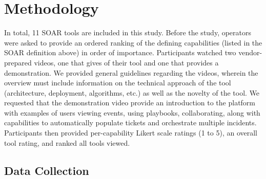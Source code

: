 \section{Methodology}
\vspace{-4mm}
In total, 11 SOAR tools are included in this study.
Before the study, operators were asked to provide an ordered ranking of the defining capabilities (listed in the SOAR definition above) in order of importance. 
Participants watched two vendor-prepared videos, one that gives of their tool and one that provides a demonstration. We provided general guidelines regarding the videos, wherein the overview must include information on the technical approach of the tool (architecture, deployment, algorithms, etc.) as well as the novelty of the tool. We requested that the demonstration video provide an introduction to the platform with examples of users viewing events, using playbooks, collaborating, along with capabilities to automatically populate tickets and orchestrate multiple incidents. Participants then provided per-capability Likert scale ratings (1 to 5), an overall tool rating, and ranked all tools viewed. 
\vspace{-2mm}
\subsection{Data Collection}
\vspace{-2mm}
